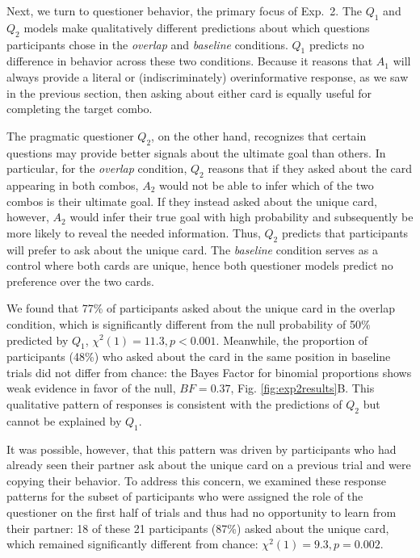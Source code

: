 \documentclass[11pt, floatsintext]{apa6}
\begin{document}
Next, we turn to questioner behavior, the primary focus of Exp.~2.
The $Q_1$ and $Q_2$ models make qualitatively different predictions about which questions participants chose in the \emph{overlap} and \emph{baseline} conditions.
$Q_1$ predicts no difference in behavior across these two conditions.
Because it reasons that $A_1$ will always provide a literal or (indiscriminately) overinformative response, as we saw in the previous section, then asking about either card is equally useful for completing the target combo.

The pragmatic questioner $Q_2$, on the other hand, recognizes that certain questions may provide better signals about the ultimate goal than others.
In particular, for the \emph{overlap} condition, $Q_2$ reasons that if they asked about the card appearing in both combos, $A_2$ would not be able to infer which of the two combos is their ultimate goal.
If they instead asked about the unique card, however, $A_2$ would infer their true goal with high probability and subsequently be more likely to reveal the needed information.
Thus, $Q_2$ predicts that participants will prefer to ask about the unique card.
The \emph{baseline} condition serves as a control where both cards are unique, hence both questioner models predict no preference over the two cards.

We found that 77\% of participants asked about the unique card in the overlap condition, which is significantly different from the null probability of 50\% predicted by $Q_1$, $\chi^2(1) = 11.3, p < 0.001$. 
Meanwhile, the proportion of participants (48\%) who asked about the card in the same position in baseline trials did not differ from chance: the Bayes Factor for binomial proportions  \cite{morey2016philosophy, morey2015package} shows weak evidence in favor of the null, $BF = 0.37$, Fig. \ref{fig:exp2results}B. 
This qualitative pattern of responses is consistent with the predictions of $Q_2$ but cannot be explained by $Q_1$.

It was possible, however, that this pattern was driven by participants who had already seen their partner ask about the unique card on a previous trial and were copying their behavior. 
To address this concern, we examined these response patterns for the subset of participants who were assigned the role of the questioner on the first half of trials and thus had no opportunity to learn from their partner: 18 of these 21 participants (87\%) asked about the unique card, which remained significantly different from chance: $\chi^2(1) = 9.3, p = 0.002$.
\end{document}
